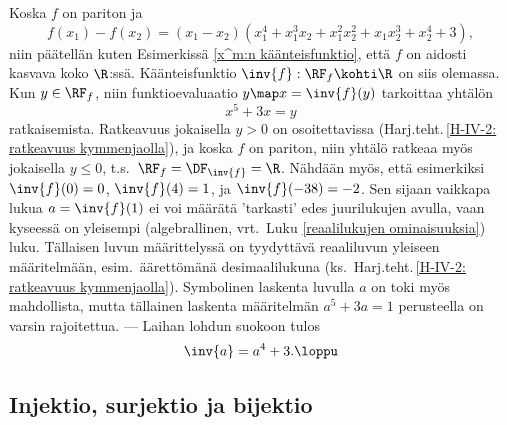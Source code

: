 \ratk Koska $f$ on pariton ja 
\[
f(x_1)-f(x_2)=(x_1-x_2)(x_1^4+x_1^3x_2+x_1^2x_2^2+x_1x_2^3+x_2^4+3),
\]
niin päätellän kuten Esimerkissä \ref{x^m:n käänteisfunktio}, että $f$ on aidosti 
kasvava koko $\R$:ssä. Käänteisfunktio $\inv{f}: \RF_f \kohti \R$ on siis olemassa. Kun
$y \in \RF_f$, niin funktioevaluaatio $y \map x = \inv{f}(y)$ tarkoittaa yhtälön
\[
x^5+3x=y
\]
ratkaisemista. Ratkeavuus jokaisella $y>0$ on osoitettavissa
(Harj.teht.\,\ref{H-IV-2: ratkeavuus kymmenjaolla}), ja koska $f$ on pariton, niin yhtälö
ratkeaa myös jokaisella $y \le 0$, t.s.\ $\RF_f=\DF_{\inv{f}}=\R$. Nähdään myös, että 
esimerkiksi $\inv{f}(0)=0$, $\inv{f}(4)=1$, ja $\inv{f}(-38)=-2$. Sen sijaan vaikkapa lukua
$a=\inv{f}(1)$ ei voi määrätä 'tarkasti' edes juurilukujen avulla, vaan kyseessä on yleisempi
(algebrallinen, vrt.\ Luku \ref{reaalilukujen ominaisuuksia}) luku. Tällaisen luvun
määrittelyssä on tyydyttävä reaaliluvun yleiseen määritelmään, esim.\ äärettömänä
desimaalilukuna (ks.\ Harj.teht.\,\ref{H-IV-2: ratkeavuus kymmenjaolla}). Symbolinen laskenta
luvulla $a$ on toki myös mahdollista, mutta tällainen laskenta määritelmän $a^5 + 3a = 1$
perusteella on varsin rajoitettua. --- Laihan lohdun suokoon tulos
\[
\inv{a}=a^4+3. \loppu
\]

\subsection{Injektio, surjektio ja bijektio}
  

